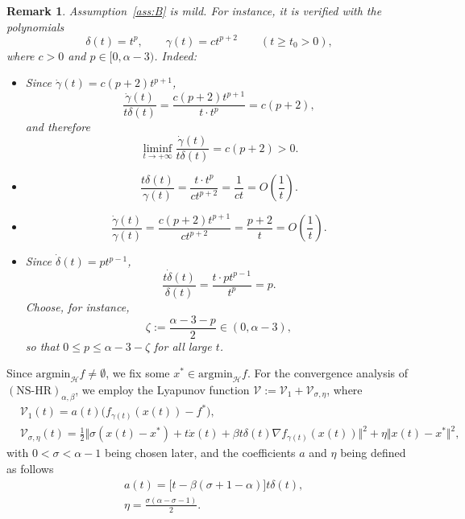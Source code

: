 \documentclass[11pt]{article}
\numberwithin{equation}{section}
\newtheorem{remark}{Remark}[section]
\begin{document}
\begin{remark}
\label{remark 3.1}
Assumption~\ref{ass:B} is mild. For instance, it is verified with the polynomials
\[
\delta(t)=t^{p},\qquad \gamma(t)=ct^{p+2}\qquad (t\ge t_0>0),
\]
where $c>0$ and \(p\in[0,\alpha-3)\). Indeed:
\begin{itemize}
\item[(i)] Since \(\dot\gamma(t)=c(p+2)t^{p+1}\),
\[
\frac{\dot\gamma(t)}{t\delta(t)}
=\frac{c(p+2)t^{p+1}}{t\cdot t^{p}}
=c(p+2),
\]
and therefore
\[
\liminf_{t\to +\infty}\frac{\dot\gamma(t)}{t\delta(t)}=c(p+2)>0.
\]

\item[(ii)]
\[
\frac{t\delta(t)}{\gamma(t)}
=\frac{t\cdot t^{p}}{ct^{p+2}}
=\frac{1}{ct}
=O\!\left(\frac{1}{t}\right).
\]

\item[(iii)]
\[
\frac{\dot\gamma(t)}{\gamma(t)}
=\frac{c(p+2)t^{p+1}}{ct^{p+2}}
=\frac{p+2}{t}
=O\!\left(\frac{1}{t}\right).
\]

\item[(iv)] Since \(\dot\delta(t)=pt^{p-1}\),
\[
\frac{t\dot\delta(t)}{\delta(t)}
=\frac{t\cdot pt^{p-1}}{t^{p}}
=p.
\]
Choose, for instance,
\[
\zeta:=\frac{\alpha-3-p}{2}\in(0,\alpha-3),
\]
so that \(0\le p\le \alpha-3-\zeta\) for all large \(t\).
\end{itemize}   
\end{remark}

Since $\text{argmin}_{\mathcal{H}}f \neq \emptyset$, we fix some $x^* \in \text{argmin}_{\mathcal{H}}f$. For the convergence analysis of $(\text{NS-HR})_{\alpha,\beta}$, we employ the Lyapunov function $\mathcal{V}:=\mathcal{V}_1+\mathcal{V}_{\sigma,\eta}$, where  
\begin{align}
&\mathcal{V}_1(t)=a(t)\Big(f_{\gamma(t)}(x(t))-f^*\Big),\label{V.1}\\
&\mathcal{V}_{\sigma,\eta}(t)=\frac{1}{2}\Big\Vert \sigma(x(t)-x^*)+t\dot{x}(t)+\beta t\delta(t)\nabla f_{\gamma(t)}(x(t)) \Big\Vert^2 +\eta\Vert x(t)-x^*\Vert^2, \label{V.2}
\end{align}
with $0<\sigma<\alpha-1$ being chosen later, and the coefficients $a$ and $\eta$ being defined as follows
\begin{align*}
    &a(t)=\Big[t-\beta(\sigma+1-\alpha)\Big]t\delta(t),\\
&\eta=\frac{\sigma(\alpha-\sigma-1)}{2}.
\end{align*}
\end{document}
